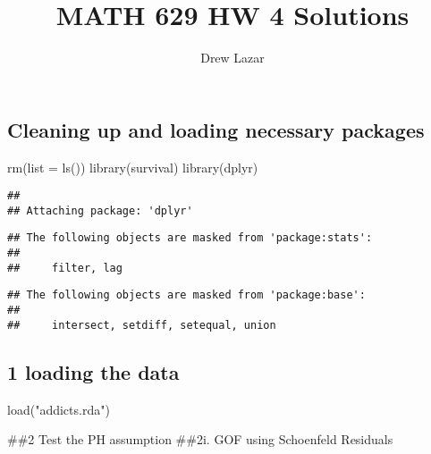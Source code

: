 \documentclass[
]{article}
\title{MATH 629 HW 4 Solutions}
\author{Drew Lazar}
\date{}
\newenvironment{Shaded}{\begin{snugshade}}{\end{snugshade}}
\newcommand{\AttributeTok}[1]{\textcolor[rgb]{0.77,0.63,0.00}{#1}}
\newcommand{\FunctionTok}[1]{\textcolor[rgb]{0.00,0.00,0.00}{#1}}
\newcommand{\NormalTok}[1]{#1}
\newcommand{\OtherTok}[1]{\textcolor[rgb]{0.56,0.35,0.01}{#1}}
\newcommand{\SpecialCharTok}[1]{\textcolor[rgb]{0.00,0.00,0.00}{#1}}
\newcommand{\StringTok}[1]{\textcolor[rgb]{0.31,0.60,0.02}{#1}}
\begin{document}
\maketitle

\hypertarget{cleaning-up-and-loading-necessary-packages}{%
\subsection{Cleaning up and loading necessary
packages}\label{cleaning-up-and-loading-necessary-packages}}

\begin{Shaded}
\begin{Highlighting}[]
\FunctionTok{rm}\NormalTok{(}\AttributeTok{list =} \FunctionTok{ls}\NormalTok{())}
\FunctionTok{library}\NormalTok{(survival)}
\FunctionTok{library}\NormalTok{(dplyr)}
\end{Highlighting}
\end{Shaded}

\begin{verbatim}
## 
## Attaching package: 'dplyr'
\end{verbatim}

\begin{verbatim}
## The following objects are masked from 'package:stats':
## 
##     filter, lag
\end{verbatim}

\begin{verbatim}
## The following objects are masked from 'package:base':
## 
##     intersect, setdiff, setequal, union
\end{verbatim}

\hypertarget{loading-the-data}{%
\subsection{1 loading the data}\label{loading-the-data}}

\begin{Shaded}
\begin{Highlighting}[]
\FunctionTok{load}\NormalTok{(}\StringTok{"addicts.rda"}\NormalTok{)}
\end{Highlighting}
\end{Shaded}

\#\#2 Test the PH assumption \#\#2i. GOF using Schoenfeld Residuals

\begin{Shaded}
\end{Shaded}
\end{document}

